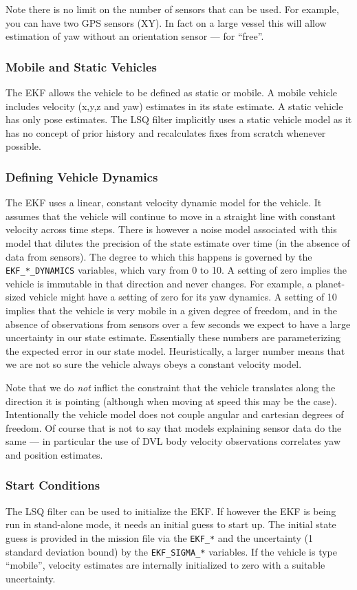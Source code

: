 \documentclass[a4paper,10pt]{article}
\newcommand{\Code}[1]{\texttt{#1} }
\newcommand{\code}[1]{\Code{#1} }
\begin{document}
Note there is no limit on the number of sensors that can be used.
For example, you can have two GPS sensors (XY). In fact on a large
vessel this will allow estimation of yaw without an orientation
sensor --- for ``free''.

\subsubsection{Mobile and Static Vehicles}
The EKF allows the vehicle to be defined as static or mobile. A
mobile vehicle includes velocity (x,y,z and yaw) estimates in its
state estimate. A static vehicle has only pose estimates. The LSQ
filter implicitly uses a static vehicle model as it has no concept
of prior history and recalculates fixes from scratch whenever
possible.


\subsubsection{Defining Vehicle Dynamics}
The EKF uses a linear, constant velocity dynamic model for the
vehicle. It assumes that the vehicle will continue to move in a
straight line with constant velocity across time steps. There is
however a noise model associated with this model that dilutes the
precision of the state estimate over time (in the absence of data
from sensors). The degree to which this happens is governed by the
\code{EKF\_*\_DYNAMICS} variables, which vary from 0 to 10. A
setting of zero implies the vehicle is immutable in that direction
and never changes. For example, a planet-sized vehicle might have a setting of
zero for its yaw dynamics. A setting of 10 implies that the
vehicle is very mobile in a given degree of freedom, and in the
absence of observations from sensors over a few seconds we expect
to have a large uncertainty in our state estimate. Essentially
these numbers are parameterizing the expected error in our
state model. Heuristically, a larger number means that we are not
so sure the vehicle always obeys a constant velocity model.

Note that we do {\em not} inflict the constraint that the vehicle
translates along the direction it is pointing (although when
moving at speed this may be the case). Intentionally the vehicle
model does not couple angular and cartesian degrees of freedom. Of
course that is not to say that models explaining sensor data do
the same --- in particular the use of DVL body velocity observations
correlates yaw and position estimates.


\subsubsection{Start Conditions}
The LSQ filter can be used to initialize the EKF. If however the
EKF is being run in stand-alone mode, it needs an initial guess to
start up. The initial state guess is provided in the mission file
via the \code{EKF\_*} and the uncertainty (1 standard deviation
bound) by the \code{EKF\_SIGMA\_*} variables. If the vehicle is
type ``mobile'', velocity estimates are internally initialized to zero with
a suitable uncertainty.
\end{document}
